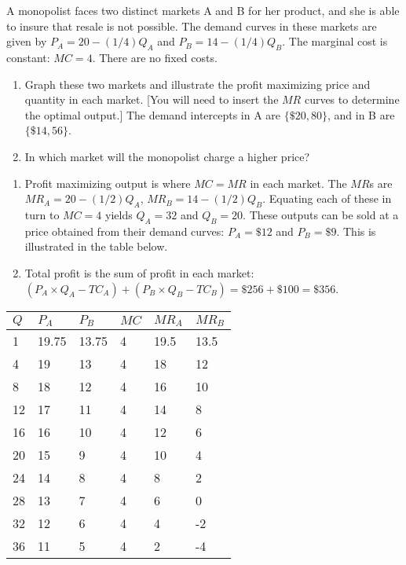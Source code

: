 \begin{enumialphparenastyle}
\begin{econex}\label{ex:ch10ex6}
A monopolist faces two distinct markets A and B for her product, and she is able to insure that resale is not possible. The demand curves in these markets are given by $P_A=20-(1/4)Q_A$ and $P_B=14-(1/4)Q_B$. The marginal cost is constant: $MC=4$. There are no fixed costs. 
\begin{enumerate}
\item	Graph these two markets and illustrate the profit maximizing price and quantity in each market. [You will need to insert the $MR$ curves to determine the optimal output.] The demand intercepts in A are $\{\$20,80\}$, and in B are $\{\$14,56\}$.
\item	In which market will the monopolist charge a higher price? 
\end{enumerate}
\begin{econsolution}
\begin{enumerate}
\item	Profit maximizing output is where $MC=MR$ in each market. The $MR$s are $MR_A=20-(1/2)Q_A$, $MR_B=14-(1/2)Q_B$. Equating each of these in turn to $MC=4$ yields $Q_A=32$ and $Q_B=20$. These outputs can be sold at a price obtained from their demand curves: $P_A=\$12$ and $P_B=\$9$. This is illustrated in the table below.
\item	Total profit is the sum of profit in each market: $(P_A\times Q_A-TC_A)+(P_B\times Q_B-TC_B)=\$256+\$100=\$356$.
\end{enumerate}
\begin{Table}{}\small
	\begin{tabu} to \linewidth {|X[1,c]X[1,c]X[1,c]X[1,c]X[1,c]X[1,c]|}	\hline
			$Q$	&	$P_A$	&	$P_B$	&	$MC$	&	$MR_A$	&	$MR_B$	\\		&	19.75	&	13.75	&	4	&	19.5	&	13.5	\\
			4	&	19	&	13	&	4	&	18	&	12	\\
		8	&	18	&	12	&	4	&	16	&	10	\\
			12	&	17	&	11	&	4	&	14	&	8	\\
		16	&	16	&	10	&	4	&	12	&	6	\\
			20	&	15	&	9	&	4	&	10	&	4	\\
		24	&	14	&	8	&	4	&	8	&	2	\\
			28	&	13	&	7	&	4	&	6	&	0	\\
		32	&	12	&	6	&	4	&	4	&	-2	\\
			36	&	11	&	5	&	4	&	2	&	-4	\\

\end{tabu}
\end{Table}
\end{econsolution}
\end{econex}
\end{enumialphparenastyle}

